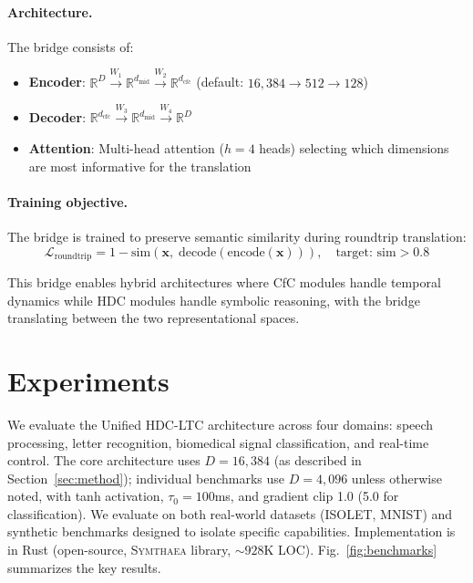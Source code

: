 \documentclass{article}
\newcommand{\R}{\mathbb{R}}
\newcommand{\hvx}{\mathbf{x}}
\newcommand{\symthaea}{\textsc{Symthaea}}
\begin{document}
\paragraph{Architecture.} The bridge consists of:
\begin{itemize}
    \item \textbf{Encoder}: $\R^D \xrightarrow{W_1} \R^{d_\text{mid}} \xrightarrow{W_2} \R^{d_\text{cfc}}$ (default: $16{,}384 \to 512 \to 128$)
    \item \textbf{Decoder}: $\R^{d_\text{cfc}} \xrightarrow{W_3} \R^{d_\text{mid}} \xrightarrow{W_4} \R^D$
    \item \textbf{Attention}: Multi-head attention ($h{=}4$ heads) selecting which dimensions are most informative for the translation
\end{itemize}

\paragraph{Training objective.} The bridge is trained to preserve semantic similarity during roundtrip translation:
\begin{equation}
    \mathcal{L}_\text{roundtrip} = 1 - \text{sim}\!\left(\hvx, \; \text{decode}(\text{encode}(\hvx))\right), \quad \text{target: sim} > 0.8
\end{equation}

This bridge enables hybrid architectures where CfC modules handle temporal dynamics while HDC modules handle symbolic reasoning, with the bridge translating between the two representational spaces.

\section{Experiments}
\label{sec:experiments}

We evaluate the Unified HDC-LTC architecture across four domains: speech processing, letter recognition, biomedical signal classification, and real-time control. The core architecture uses $D = 16{,}384$ (as described in Section~\ref{sec:method}); individual benchmarks use $D = 4{,}096$ unless otherwise noted, with tanh activation, $\tau_0 = 100$ms, and gradient clip 1.0 (5.0 for classification). We evaluate on both real-world datasets (ISOLET, MNIST) and synthetic benchmarks designed to isolate specific capabilities. Implementation is in Rust (open-source, \symthaea{} library, ${\sim}928$K LOC). Fig.~\ref{fig:benchmarks} summarizes the key results.
\end{document}
